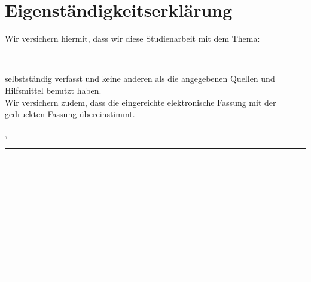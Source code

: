 \clearpage

\chapter*{Eigenständigkeitserklärung}

Wir versichern hiermit, dass wir diese Studienarbeit mit dem Thema:
\begin{center}
	\textit{\varTitle} \\
\end{center}
selbstständig verfasst und keine anderen als die angegebenen Quellen und Hilfs\-mittel benutzt haben. \\
Wir versichern zudem, dass die eingereichte elektronische Fassung mit der ge\-druckten Fassung übereinstimmt.

\vspace{2em}

\varLocation, \varDate
\vspace{3em}

\rule{6cm}{0.4pt}\\
\varAuthorA
\\
\\
\\
\rule{6cm}{0.4pt}\\
\varAuthorB
\\
\\
\\
\rule{6cm}{0.4pt}\\
\varAuthorC

\newpage